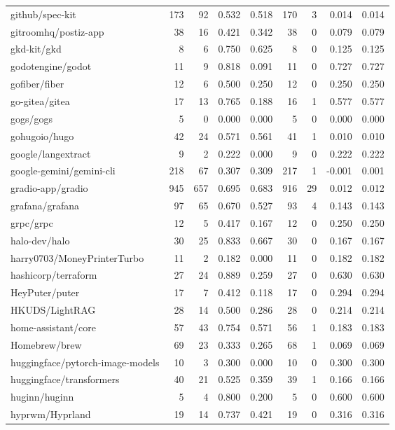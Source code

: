 \begin{tabular}{lrrrrrrrr}
github/spec-kit & 173 & 92 & 0.532 & 0.518 & 170 & 3 & 0.014 & 0.014 \\
gitroomhq/postiz-app & 38 & 16 & 0.421 & 0.342 & 38 & 0 & 0.079 & 0.079 \\
gkd-kit/gkd & 8 & 6 & 0.750 & 0.625 & 8 & 0 & 0.125 & 0.125 \\
godotengine/godot & 11 & 9 & 0.818 & 0.091 & 11 & 0 & 0.727 & 0.727 \\
gofiber/fiber & 12 & 6 & 0.500 & 0.250 & 12 & 0 & 0.250 & 0.250 \\
go-gitea/gitea & 17 & 13 & 0.765 & 0.188 & 16 & 1 & 0.577 & 0.577 \\
gogs/gogs & 5 & 0 & 0.000 & 0.000 & 5 & 0 & 0.000 & 0.000 \\
gohugoio/hugo & 42 & 24 & 0.571 & 0.561 & 41 & 1 & 0.010 & 0.010 \\
google/langextract & 9 & 2 & 0.222 & 0.000 & 9 & 0 & 0.222 & 0.222 \\
google-gemini/gemini-cli & 218 & 67 & 0.307 & 0.309 & 217 & 1 & -0.001 & 0.001 \\
gradio-app/gradio & 945 & 657 & 0.695 & 0.683 & 916 & 29 & 0.012 & 0.012 \\
grafana/grafana & 97 & 65 & 0.670 & 0.527 & 93 & 4 & 0.143 & 0.143 \\
grpc/grpc & 12 & 5 & 0.417 & 0.167 & 12 & 0 & 0.250 & 0.250 \\
halo-dev/halo & 30 & 25 & 0.833 & 0.667 & 30 & 0 & 0.167 & 0.167 \\
harry0703/MoneyPrinterTurbo & 11 & 2 & 0.182 & 0.000 & 11 & 0 & 0.182 & 0.182 \\
hashicorp/terraform & 27 & 24 & 0.889 & 0.259 & 27 & 0 & 0.630 & 0.630 \\
HeyPuter/puter & 17 & 7 & 0.412 & 0.118 & 17 & 0 & 0.294 & 0.294 \\
HKUDS/LightRAG & 28 & 14 & 0.500 & 0.286 & 28 & 0 & 0.214 & 0.214 \\
home-assistant/core & 57 & 43 & 0.754 & 0.571 & 56 & 1 & 0.183 & 0.183 \\
Homebrew/brew & 69 & 23 & 0.333 & 0.265 & 68 & 1 & 0.069 & 0.069 \\
huggingface/pytorch-image-models & 10 & 3 & 0.300 & 0.000 & 10 & 0 & 0.300 & 0.300 \\
huggingface/transformers & 40 & 21 & 0.525 & 0.359 & 39 & 1 & 0.166 & 0.166 \\
huginn/huginn & 5 & 4 & 0.800 & 0.200 & 5 & 0 & 0.600 & 0.600 \\
hyprwm/Hyprland & 19 & 14 & 0.737 & 0.421 & 19 & 0 & 0.316 & 0.316 \\

\end{tabular}

